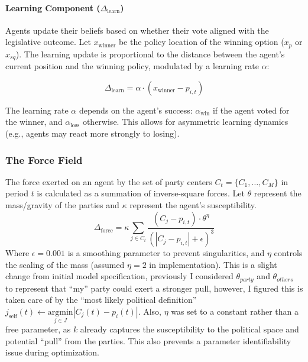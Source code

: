 \documentclass{article}
\begin{document}
	\paragraph{Learning Component ($\Delta_{\text{learn}}$)}
	Agents update their beliefs based on whether their vote aligned with the legislative outcome. Let $x_{\text{winner}}$ be the policy location of the winning option ($x_p$ or $x_{sq}$). The learning update is proportional to the distance between the agent's current position and the winning policy, modulated by a learning rate $\alpha$:
	
	\begin{equation}
		\Delta_{\text{learn}} = \alpha \cdot (x_{\text{winner}} - p_{i,t})
	\end{equation}
	
	The learning rate $\alpha$ depends on the agent's success: $\alpha_{\text{win}}$ if the agent voted for the winner, and $\alpha_{\text{loss}}$ otherwise. This allows for asymmetric learning dynamics (e.g., agents may react more strongly to losing).
	
	\subsubsection{The Force Field}
	The force exerted on an agent by the set of party centers $C_t = \{C_1, \dots, C_M\}$ in period $t$ is calculated as a summation of inverse-square forces. Let $\theta$ represent the mass/gravity of the parties and $\kappa$ represent the agent's susceptibility.
	\begin{equation}
		\Delta_{\text{force}} = \kappa \sum_{j \in C_t} \frac{(C_j - p_{i,t}) \cdot \theta^\eta}{(|C_j - p_{i,t}| + \epsilon)^3}
	\end{equation}
	Where $\epsilon = 0.001$ is a smoothing parameter to prevent singularities, and $\eta$ controls the scaling of the mass (assumed $\eta=2$ in implementation). This is a slight change from initial model specification, previously I considered $\theta_{party}$ and $\theta_{others}$ to represent that ``my'' party could exert a stronger pull, however, I figured this is taken care of by the ``most likely political definition''  $j_{\text{self}}(t) \gets \underset{j \in J}{\text{argmin}} |C_j(t) - p_i(t)|$. Also, $\eta$ was set to a constant rather than a free parameter, as $k$ already captures the susceptibility to the political space and potential ``pull'' from the parties. This also prevents a parameter identifiability issue during optimization.
	
\end{document}
